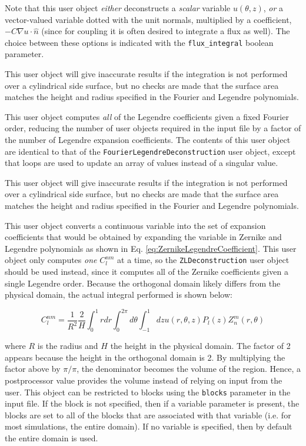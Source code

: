 \documentclass[10pt]{article}
\newcommand{\beq}{\begin{equation}}
\newcommand{\eeq}{\end{equation}}
\newcounter{subsubsubsection}[subsubsection]
\numberwithin{equation}{section} %
\begin{document}
Note that this user object {\it either} deconstructs a {\it scalar} variable \(u(\theta, z)\), {\it or} a vector-valued variable dotted with the unit normals, multiplied by a coefficient, \(-C\nabla u\cdot\hat{n}\) (since for coupling it is often desired to integrate a flux as well). The choice between these options is indicated with the {\tt flux\_integral} boolean parameter.

\color{magenta}
This user object will give inaccurate results if the integration is not performed over a cylindrical side surface, but no checks are made that the surface area matches the height and radius specified in the Fourier and Legendre polynomials.
\color{black}

This user object computes {\it all} of the Legendre coefficients given a fixed Fourier order, reducing the number of user objects required in the input file by a factor of the number of Legendre expansion coefficients. The contents of this user object are identical to that of the {\tt FourierLegendreDeconstruction} user object, except that loops are used to update an array of values instead of a singular value.

\color{magenta}
This user object will give inaccurate results if the integration is not performed over a cylindrical side surface, but no checks are made that the surface area matches the height and radius specified in the Fourier and Legendre polynomials.
\color{black}

This user object converts a continuous variable into the set of expansion coefficients that would be obtained by expanding the variable in Zernike and Legendre polynomials as shown in Eq. \eqref{eq:ZernikeLegendreCoefficient}. This user object only computes {\it one} \(C_l^{nm}\) at a time, so the {\tt ZLDeconstruction} user object should be used instead, since it computes all of the Zernike coefficients given a single Legendre order. Because the orthogonal domain likely differs from the physical domain, the actual integral performed is shown below:

\beq
C_l^{nm}=\frac{1}{R^2}\frac{2}{H}\int_0^1rdr\int_{0}^{2\pi}d\theta\int_{-1}^{1}dzu(r,\theta,z)P_l(z)Z_n^m(r,\theta)
\eeq

where \(R\) is the radius and \(H\) the height in the physical domain. The factor of 2 appears because the height in the orthogonal domain is 2. By multiplying the factor above by \(\pi/\pi\), the denominator becomes the volume of the region. Hence, a postprocessor value provides the volume instead of relying on input from the user. This object can be restricted to blocks using the {\tt blocks} parameter in the input file. If the block is not specified, then if a variable parameter is present, the blocks are set to all of the blocks that are associated with that variable (i.e. for most simulations, the entire domain). If no variable is specified, then by default the entire domain is used. 
\end{document}

